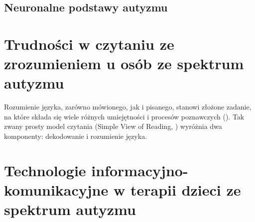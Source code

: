     \subsection{Neuronalne podstawy autyzmu}

\section{Trudności w czytaniu ze zrozumieniem u osób ze spektrum autyzmu}

Rozumienie języka, zarówno mówionego, jak i pisanego, stanowi złożone zadanie, na które składa się wiele różnych umiejętności i procesów poznawczych (\cite{cain2008children}). Tak zwany prosty model czytania (Simple View of Reading, \cite{Hoover1990}) wyróżnia dwa komponenty: dekodowanie i rozumienie języka. 

\section{Technologie informacyjno-komunikacyjne w terapii dzieci ze spektrum autyzmu}